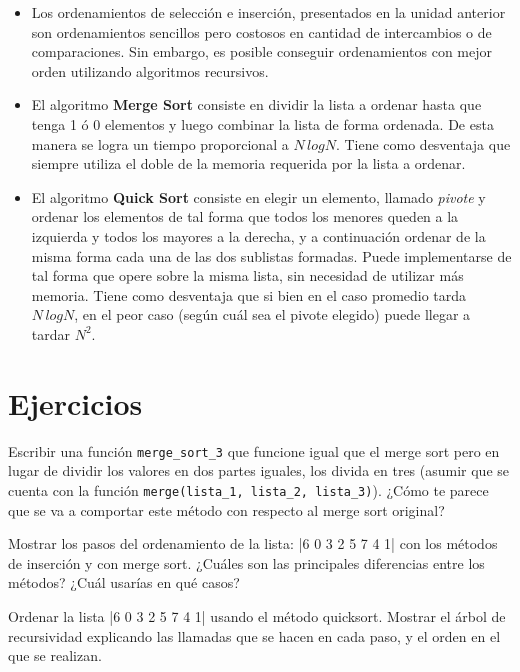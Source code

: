 \begin{itemize}

\item Los ordenamientos de selección e inserción, presentados en la unidad
anterior son ordenamientos sencillos pero costosos en cantidad de
intercambios o de comparaciones.  Sin embargo, es posible conseguir
ordenamientos con mejor orden utilizando algoritmos recursivos.

\item El algoritmo {\bf Merge Sort} consiste en dividir la lista a ordenar
hasta que tenga 1 ó 0 elementos y luego combinar la lista de forma ordenada.
De esta manera se logra un tiempo proporcional a $N \, log N$.  Tiene como
desventaja que siempre utiliza el doble de la memoria requerida por la lista a
ordenar.

\item El algoritmo {\bf Quick Sort} consiste en elegir un elemento, llamado
{\it pivote} y ordenar los elementos de tal forma que todos los menores queden
a la izquierda y todos los mayores a la derecha, y a continuación ordenar de la
misma forma cada una de las dos sublistas formadas.  Puede implementarse de tal
forma que opere sobre la misma lista, sin necesidad de utilizar más memoria.
Tiene como desventaja que si bien en el caso promedio tarda $N \, log N$, en el
peor caso (según cuál sea el pivote elegido) puede llegar a tardar $N^2$.

\end{itemize}

\newpage
\section{Ejercicios}

\begin{ejercicio}
Escribir una función \verb!merge_sort_3! que funcione igual que el merge sort
pero en lugar de dividir los valores en dos partes iguales, los divida en tres
(asumir que se cuenta con la función \verb!merge(lista_1, lista_2, lista_3)!).
¿Cómo te parece que se va a comportar este método con respecto al merge sort
original?
\end{ejercicio}

\begin{ejercicio}
Mostrar los pasos del ordenamiento de la lista: |6 0 3 2 5 7 4 1| con
los métodos de inserción y con merge sort. ¿Cuáles son las principales
diferencias entre los métodos? ¿Cuál usarías en qué casos?
\end{ejercicio}

\begin{ejercicio}
Ordenar la lista |6 0 3 2 5 7 4 1| usando el método quicksort. Mostrar
el árbol de recursividad explicando las llamadas que se hacen en cada
paso, y el orden en el que se realizan.
\end{ejercicio}
